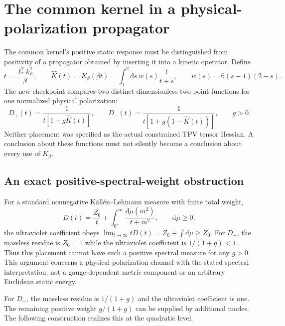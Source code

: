 \documentclass[11pt,oneside]{report}
\newcommand{\dd}{\mathrm d}
\begin{document}
\section{The common kernel in a physical-polarization propagator}
\label{sec:spectral-parent}
The common kernel's positive static response must be distinguished from positivity of a propagator obtained by inserting it into a kinetic operator. Define
\begin{equation}
t=\frac{\ell_*^2k_E^2}{\beta},\qquad
\widehat K(t)=K_\beta(\beta t)
=\int_1^2\dd s\,w(s)\frac{t}{t+s},\qquad w(s)=6(s-1)(2-s).
\end{equation}
The new checkpoint compares two distinct dimensionless two-point functions for one normalized physical polarization:
\begin{equation}
D_+(t)=\frac{1}{t[1+g\widehat K(t)]},\qquad
D_-(t)=\frac{1}{t[1+g(1-\widehat K(t))]},\qquad g>0.
\end{equation}
Neither placement was specified as the actual constrained TPV tensor Hessian. A conclusion about these functions must not silently become a conclusion about every use of $K_\beta$.

\subsection{An exact positive-spectral-weight obstruction}
For a standard nonnegative K\"all\'en--Lehmann measure with finite total weight,
\begin{equation}
D(t)=\frac{Z_0}{t}+\int_{0^+}^{\infty}
\frac{\dd\mu(m^2)}{t+m^2},\qquad \dd\mu\ge0,
\end{equation}
the ultraviolet coefficient obeys $\lim_{t\to\infty}tD(t)=Z_0+\int\dd\mu\ge Z_0$. For $D_+$, the massless residue is $Z_0=1$ while the ultraviolet coefficient is $1/(1+g)<1$. Thus this placement cannot have such a positive spectral measure for any $g>0$. This argument concerns a physical-polarization channel with the stated spectral interpretation, not a gauge-dependent metric component or an arbitrary Euclidean static energy.

For $D_-$, the massless residue is $1/(1+g)$ and the ultraviolet coefficient is one. The remaining positive weight $g/(1+g)$ can be supplied by additional modes. The following construction realizes this at the quadratic level.
\end{document}
